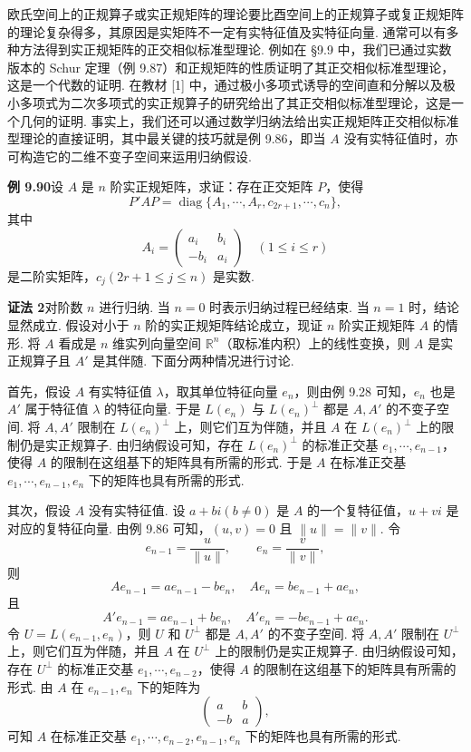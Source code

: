 \documentclass[UTF8, 12pt, fontset=fandol, oneside]{ctexart}
\begin{document}
欧氏空间上的正规算子或实正规矩阵的理论要比酉空间上的正规算子或复正规矩阵的理论复杂得多，其原因是实矩阵不一定有实特征值及实特征向量. 通常可以有多种方法得到实正规矩阵的正交相似标准型理论. 例如在 §9.9 中，我们已通过实数版本的 Schur 定理（例 9.87）和正规矩阵的性质证明了其正交相似标准型理论，这是一个代数的证明. 在教材 [1] 中，通过极小多项式诱导的空间直和分解以及极小多项式为二次多项式的实正规算子的研究给出了其正交相似标准型理论，这是一个几何的证明. 事实上，我们还可以通过数学归纳法给出实正规矩阵正交相似标准型理论的直接证明，其中最关键的技巧就是例 9.86，即当 $A$ 没有实特征值时，亦可构造它的二维不变子空间来运用归纳假设.

\noindent\textbf{例 9.90}\quad 设 $A$ 是 $n$ 阶实正规矩阵，求证：存在正交矩阵 $P$，使得
\[
P'AP=\operatorname{diag}\{A_1,\cdots,A_r,c_{2r+1},\cdots,c_n\},
\]
其中
\[
A_i=\begin{pmatrix}
a_i&b_i\\
-b_i&a_i
\end{pmatrix}\quad (1\le i\le r)
\]
是二阶实矩阵，$c_j(2r+1\le j\le n)$ 是实数.

\noindent\textbf{证法 2}\quad 对阶数 $n$ 进行归纳. 当 $n=0$ 时表示归纳过程已经结束. 当 $n=1$ 时，结论显然成立. 假设对小于 $n$ 阶的实正规矩阵结论成立，现证 $n$ 阶实正规矩阵 $A$ 的情形. 将 $A$ 看成是 $n$ 维实列向量空间 $\mathbb{R}^n$（取标准内积）上的线性变换，则 $A$ 是实正规算子且 $A'$ 是其伴随. 下面分两种情况进行讨论.

首先，假设 $A$ 有实特征值 $\lambda$，取其单位特征向量 $e_n$，则由例 9.28 可知，$e_n$ 也是 $A'$ 属于特征值 $\lambda$ 的特征向量. 于是 $L(e_n)$ 与 $L(e_n)^\perp$ 都是 $A,A'$ 的不变子空间. 将 $A,A'$ 限制在 $L(e_n)^\perp$ 上，则它们互为伴随，并且 $A$ 在 $L(e_n)^\perp$ 上的限制仍是实正规算子. 由归纳假设可知，存在 $L(e_n)^\perp$ 的标准正交基 $e_1,\cdots,e_{n-1}$，使得 $A$ 的限制在这组基下的矩阵具有所需的形式. 于是 $A$ 在标准正交基 $e_1,\cdots,e_{n-1},e_n$ 下的矩阵也具有所需的形式.

其次，假设 $A$ 没有实特征值. 设 $a+bi(b\ne0)$ 是 $A$ 的一个复特征值，$u+vi$ 是对应的复特征向量. 由例 9.86 可知，$(u,v)=0$ 且 $\|u\|=\|v\|$. 令
\[
e_{n-1}=\frac{u}{\|u\|},\qquad e_n=\frac{v}{\|v\|},
\]
则
\[
Ae_{n-1}=ae_{n-1}-be_n,\quad Ae_n=be_{n-1}+ae_n,
\]
且
\[
A'e_{n-1}=ae_{n-1}+be_n,\quad A'e_n=-be_{n-1}+ae_n.
\]
令 $U=L(e_{n-1},e_n)$，则 $U$ 和 $U^\perp$ 都是 $A,A'$ 的不变子空间. 将 $A,A'$ 限制在 $U^\perp$ 上，则它们互为伴随，并且 $A$ 在 $U^\perp$ 上的限制仍是实正规算子. 由归纳假设可知，存在 $U^\perp$ 的标准正交基 $e_1,\cdots,e_{n-2}$，使得 $A$ 的限制在这组基下的矩阵具有所需的形式. 由 $A$ 在 $e_{n-1},e_n$ 下的矩阵为
\[
\begin{pmatrix}
a&b\\
-b&a
\end{pmatrix},
\]
可知 $A$ 在标准正交基 $e_1,\cdots,e_{n-2},e_{n-1},e_n$ 下的矩阵也具有所需的形式.
\end{document}
